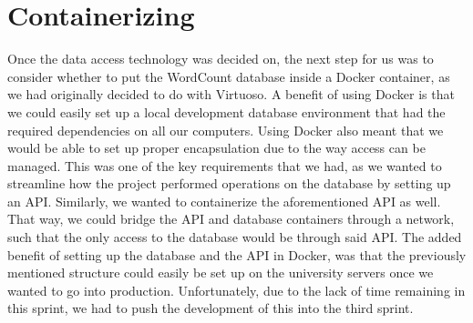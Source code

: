 \section{Containerizing}\label{sec:Containerizing}
Once the data access technology was decided on, the next step for us was to consider whether to put the WordCount database inside a Docker container, as we had originally decided to do with Virtuoso. A benefit of using Docker is that we could easily set up a local development database environment that had the required dependencies on all our computers. Using Docker also meant that we would be able to set up proper encapsulation due to the way access can be managed. This was one of the key requirements that we had, as we wanted to streamline how the \knox{} project performed operations on the database by setting up an API. 
Similarly, we wanted to containerize the aforementioned API as well. That way, we could bridge the API and database containers through a network, such that the only access to the database would be through said API.
The added benefit of setting up the database and the API in Docker, was that the previously mentioned structure could easily be set up on the university servers once we wanted to go into production.
Unfortunately, due to the lack of time remaining in this sprint, we had to push the development of this into the third sprint.